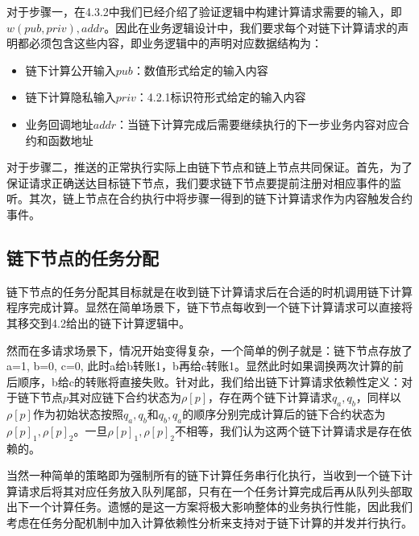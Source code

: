 对于步骤一，在4.3.2中我们已经介绍了验证逻辑中构建计算请求需要的输入，即$w(pub, priv), addr$。因此在业务逻辑设计中，我们要求每个对链下计算请求的声明都必须包含这些内容，即业务逻辑中的声明对应数据结构为：
\begin{itemize}
    \setlength{\itemsep}{0pt}
    \setlength{\parsep}{0pt}
    \setlength{\parskip}{0pt}
    \item 链下计算公开输入$pub$：数值形式给定的输入内容
    \item 链下计算隐私输入$priv$：4.2.1标识符形式给定的输入内容
    \item 业务回调地址$addr$：当链下计算完成后需要继续执行的下一步业务内容对应合约和函数地址
\end{itemize}

对于步骤二，推送的正常执行实际上由链下节点和链上节点共同保证。首先，为了保证请求正确送达目标链下节点，我们要求链下节点要提前注册对相应事件的监听。其次，链上节点在合约执行中将步骤一得到的链下计算请求作为内容触发合约事件。
\subsection{链下节点的任务分配}
链下节点的任务分配其目标就是在收到链下计算请求后在合适的时机调用链下计算程序完成计算。显然在简单场景下，链下节点每收到一个链下计算请求可以直接将其移交到4.2给出的链下计算逻辑中。

然而在多请求场景下，情况开始变得复杂，一个简单的例子就是：链下节点存放了a=1, b=0, c=0, 此时a给b转账1，b再给c转账1。显然此时如果调换两次计算的前后顺序，b给c的转账将直接失败。针对此，我们给出链下计算请求依赖性定义：对于链下节点$p$其对应链下合约状态为$\rho[p]$，存在两个链下计算请求$q_a, q_b$，同样以$\rho[p]$作为初始状态按照$q_a, q_b$和$q_b, q_a$的顺序分别完成计算后的链下合约状态为$\rho[p]_1, \rho[p]_2$。一旦$\rho[p]_1, \rho[p]_2$不相等，我们认为这两个链下计算请求是存在依赖的。

当然一种简单的策略即为强制所有的链下计算任务串行化执行，当收到一个链下计算请求后将其对应任务放入队列尾部，只有在一个任务计算完成后再从队列头部取出下一个计算任务。遗憾的是这一方案将极大影响整体的业务执行性能，因此我们考虑在任务分配机制中加入计算依赖性分析来支持对于链下计算的并发并行执行。

